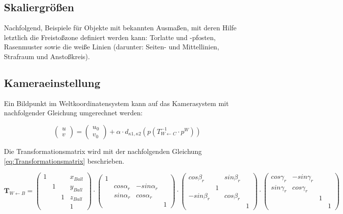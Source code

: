 \documentclass{ezb}
\begin{document}
\subsection{Skaliergrößen}\label{b:skaliergr}
Nachfolgend, Beispiele für Objekte mit bekannten Ausmaßen, mit deren Hilfe letztlich die Freistoßzone definiert werden kann: Torlatte und -pfosten, Rasenmuster sowie die weiße Linien (darunter: Seiten- und Mittellinien, Strafraum und Anstoßkreis). 
\subsection{Kameraeinstellung}
Ein Bildpunkt im Weltkoordinatensystem kann auf das Kamerasystem mit nachfolgender Gleichung umgerechnet werden:\\
\begin{small}
\begin{equation}
\left(
\begin{array}{c}
      u \\
      v
\end{array}
\right)
=
\left(
\begin{array}{c}
      u_{0} \\
      v_{0}
\end{array}   
\right)
+ \alpha \cdot d_{\kappa1 ,\kappa2}(p(T^{-1}_{W\leftarrow C}\cdot p^{W})) 
\label{eq:Kameragleichung}
\end{equation}
\end{small}
Die Transformationsmatrix wird mit der nachfolgenden Gleichung \ref{eq:Transformationsmatrix} beschrieben.\\
\begin{small}
\begin{equation}
\textbf{T}_{W\leftarrow B}=
\begin{pmatrix}
1 & &  & x_{Ball} \\
 & 1 & & y_{Ball} \\
 & & 1 & z_{Ball} \\
 & & & 1
\end{pmatrix}
\cdot
\begin{pmatrix}
1 & &  & \\
 & cos \alpha_{r} & -sin \alpha_{r} & \\
 & sin \alpha_{r} & cos \alpha_{r} & \\
 & & & 1
\end{pmatrix}
\cdot
\begin{pmatrix}
cos \beta_{r} & & sin \beta_{r} & \\
 & 1 & & \\
-sin \beta_{r} & & cos \beta_{r} & \\
 & & & 1
\end{pmatrix}
\cdot
\begin{pmatrix}
cos \gamma_{r} & -sin \gamma_{r} & & \\
sin \gamma_{r} & cos \gamma_{r} & & \\
 & & 1 & \\
 & & & 1
\end{pmatrix}
\label{eq:Transformationsmatrix}
\end{equation}  
\end{small}
\end{document}
